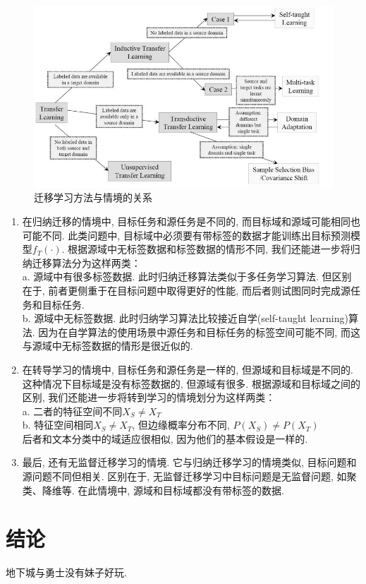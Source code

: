 \documentclass[10pt,journal,compsoc]{IEEEtran}
\begin{document}
\begin{figure}[!ht]
\centering
\includegraphics[width=30pc]{img/survey_fig1.jpg}
\caption{迁移学习方法与情境的关系}
\label{fig:survey_method}
\end{figure}


\begin{enumerate}
\item 在归纳迁移的情境中, 目标任务和源任务是不同的, 而目标域和源域可能相同也可能不同. 此类问题中, 目标域中必须要有带标签的数据才能训练出目标预测模型$f_T(\cdot)$. 根据源域中无标签数据和标签数据的情形不同, 我们还能进一步将归纳迁移算法分为这样两类：\\
a. 源域中有很多标签数据. 此时归纳迁移算法类似于多任务学习算法. 但区别在于, 前者更侧重于在目标问题中取得更好的性能, 而后者则试图同时完成源任务和目标任务. \\
b. 源域中无标签数据. 此时归纳学习算法比较接近自学(self-taught learning)算法. 因为在自学算法的使用场景中源任务和目标任务的标签空间可能不同, 而这与源域中无标签数据的情形是很近似的. 

\item 在转导学习的情境中, 目标任务和源任务是一样的, 但源域和目标域是不同的. 这种情况下目标域是没有标签数据的, 但源域有很多. 根据源域和目标域之间的区别, 我们还能进一步将转到学习的情境划分为这样两类：\\
a. 二者的特征空间不同$X_S \ne X_T$\\
b. 特征空间相同$X_S \ne X_T$, 但边缘概率分布不同, $P(X_S) \ne P(X_T)$\\
后者和文本分类中的域适应很相似, 因为他们的基本假设是一样的. 
\item 最后, 还有无监督迁移学习的情境. 它与归纳迁移学习的情境类似, 目标问题和源问题不同但相关. 区别在于, 无监督迁移学习中目标问题是无监督问题, 如聚类、降维等. 在此情境中, 源域和目标域都没有带标签的数据. 
\end{enumerate}




\section{结论}

地下城与勇士没有妹子好玩. 



\end{document}
